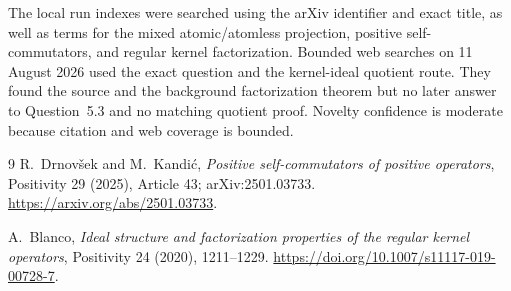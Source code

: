 \documentclass[11pt]{article}
\begin{document}
The local run indexes were searched using the arXiv identifier and exact
title, as well as terms for the mixed atomic/atomless projection, positive
self-commutators, and regular kernel factorization.  Bounded web searches on
11 August 2026 used the exact question and the kernel-ideal quotient route.
They found the source and the background factorization theorem but no later
answer to Question~5.3 and no matching quotient proof.  Novelty confidence
is moderate because citation and web coverage is bounded.

\begin{thebibliography}{9}
R.~Drnov\v{s}ek and M.~Kandi\'c,
\emph{Positive self-commutators of positive operators},
Positivity 29 (2025), Article 43;
arXiv:2501.03733.
\url{https://arxiv.org/abs/2501.03733}.

A.~Blanco,
\emph{Ideal structure and factorization properties of the regular kernel
operators},
Positivity 24 (2020), 1211--1229.
\url{https://doi.org/10.1007/s11117-019-00728-7}.
\end{thebibliography}
\end{document}
